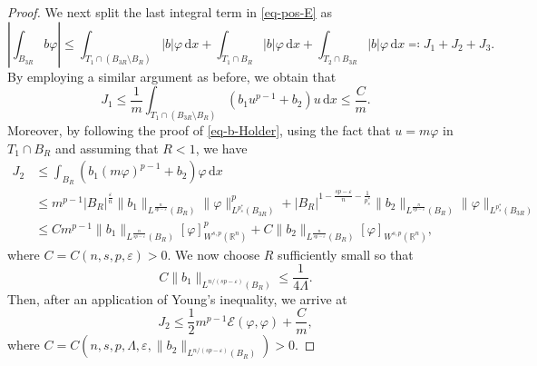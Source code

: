\documentclass[11pt]{amsart}
\theoremstyle{plain}
\theoremstyle{definition}
\numberwithin{equation}{section}
\begin{document}
\begin{proof}
We next split the last integral term in \eqref{eq-pos-E} as
\begin{equation*}
    \left|\int_{B_{3R}} b\varphi\right| \leq \int_{T_1 \cap (B_{3R} \setminus B_{R})}|b|\varphi\,\mathrm{d}x+\int_{T_1 \cap B_{R}}|b|\varphi\,\mathrm{d}x+\int_{T_2 \cap B_{3R}}|b|\varphi\,\mathrm{d}x \eqqcolon J_1+J_2+J_3.
\end{equation*}
By employing a similar argument as before, we obtain that
\begin{equation*}
        J_1 \leq \frac{1}{m} \int_{T_1 \cap (B_{3R}\setminus B_{R})} (b_1u^{p-1}+b_2)u\,\mathrm{d}x \leq \frac{C}{m}.
\end{equation*}
Moreover, by following the proof of \eqref{eq-b-Holder}, using the fact that $u=m\varphi$ in $T_1 \cap B_R$ and assuming that $R<1$, we have
\begin{equation*}
    \begin{aligned}
        J_2 
        &\leq \int_{B_R} (b_1 (m\varphi)^{p-1}+b_2)\varphi\,\mathrm{d}x\\
        &\leq m^{p-1} |B_{R}|^{\frac{\varepsilon}{n}}\|b_1\|_{L^{\frac{n}{sp-\varepsilon}}(B_R)} \|\varphi\|_{L^{p_s^{\ast}}(B_{3R})}^{p}+|B_{R}|^{1-\frac{sp-\varepsilon}{n}-\frac{1}{p_s^{\ast}}}\|b_2\|_{L^{\frac{n}{sp-\varepsilon}}(B_R)}\|\varphi\|_{L^{p_s^{\ast}}(B_{3R})}\\
        &\leq Cm^{p-1} \|b_1\|_{L^{\frac{n}{sp-\varepsilon}}(B_R)} [\varphi]_{W^{s, p}(\mathbb{R}^n)}^{p}+C\|b_2\|_{L^{\frac{n}{sp-\varepsilon}}(B_R)}[\varphi]_{W^{s, p}(\mathbb{R}^n)},
    \end{aligned}
\end{equation*}
where $C=C(n, s, p, \varepsilon)>0$. We now choose $R$ sufficiently small so that
\begin{equation}\label{eq-R}
C\|b_1\|_{L^{n/(sp-\varepsilon)}(B_R)}\leq \frac{1}{4\Lambda}.
\end{equation}
Then, after an application of Young's inequality, we arrive at
\begin{equation*}
    J_2 \leq \frac{1}{2}m^{p-1}\mathcal{E}(\varphi, \varphi)+\frac{C}{m},
\end{equation*}
where $C=C(n, s, p, \Lambda, \varepsilon, \|b_2\|_{L^{n/(sp-\varepsilon)}(B_R)})>0$.


\end{proof}
\end{document}
